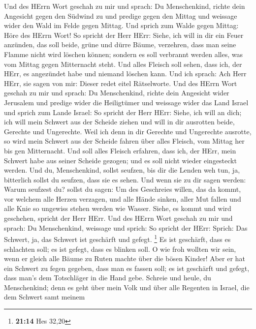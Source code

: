  Und des HErrn Wort geschah zu mir und sprach:
 Du Menschenkind, richte dein Angesicht gegen den Südwind
zu und predige gegen den Mittag und weissage wider den Wald im Felde
gegen Mittag.  Und sprich zum Walde gegen Mittag: Höre des
HErrn Wort! So spricht der Herr HErr: Siehe, ich will in dir ein Feuer
anzünden, das soll beide, grüne und dürre Bäume, verzehren, dass man
seine Flamme nicht wird löschen können; sondern es soll verbrannt werden
alles, was vom Mittag gegen Mitternacht steht.  Und alles
Fleisch soll sehen, dass ich, der HErr, es angezündet habe und niemand
löschen kann.  Und ich sprach: Ach Herr HErr, sie sagen
von mir: Dieser redet eitel Rätselworte.  Und des HErrn
Wort geschah zu mir und sprach:  Du Menschenkind, richte
dein Angesicht wider Jerusalem und predige wider die Heiligtümer und
weissage wider das Land Israel  und sprich zum Lande
Israel: So spricht der Herr HErr: Siehe, ich will an dich; ich will mein
Schwert aus der Scheide ziehen und will in dir ausrotten beide, Gerechte
und Ungerechte.  Weil ich denn in dir Gerechte und
Ungerechte ausrotte, so wird mein Schwert aus der Scheide fahren über
alles Fleisch, vom Mittag her bis gen Mitternacht.  Und
soll alles Fleisch erfahren, dass ich, der HErr, mein Schwert habe aus
seiner Scheide gezogen; und es soll nicht wieder eingesteckt werden.
 Und du, Menschenkind, sollst seufzen, bis dir die Lenden
weh tun, ja, bitterlich sollst du seufzen, dass sie es sehen.
 Und wenn sie zu dir sagen werden: Warum seufzest du?
sollst du sagen: Um des Geschreies willen, das da kommt, vor welchem
alle Herzen verzagen, und alle Hände sinken, aller Mut fallen und alle
Knie so ungewiss stehen werden wie Wasser. Siehe, es kommt und wird
geschehen, spricht der Herr HErr.  Und des HErrn Wort
geschah zu mir und sprach:  Du Menschenkind, weissage und
sprich: So spricht der HErr: Sprich: Das Schwert, ja, das Schwert ist
geschärft und gefegt. \footnote{\textbf{21:14} Hes 32,20}
 Es ist geschärft, dass es schlachten soll; es ist
gefegt, dass es blinken soll. O wie froh wollten wir sein, wenn er
gleich alle Bäume zu Ruten machte über die bösen Kinder! 
Aber er hat ein Schwert zu fegen gegeben, dass man es fassen soll; es
ist geschärft und gefegt, dass man's dem Totschläger in die Hand gebe.
 Schreie und heule, du Menschenkind; denn es geht über
mein Volk und über alle Regenten in Israel, die dem Schwert samt meinem
